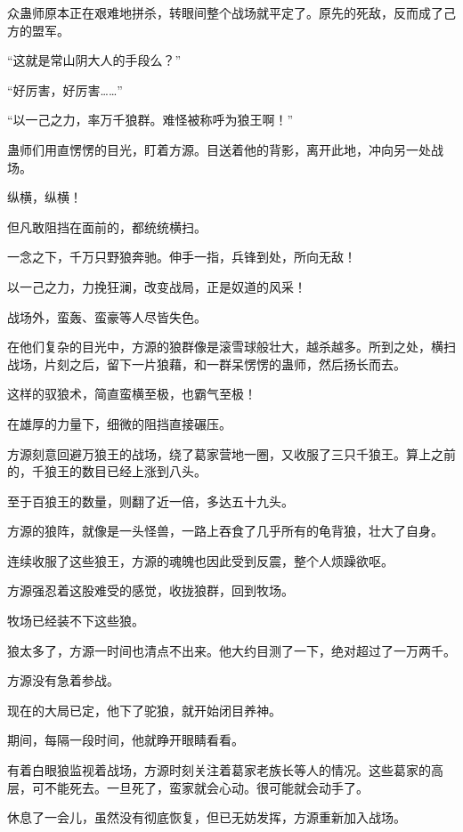 
\begin{this_body}

众蛊师原本正在艰难地拼杀，转眼间整个战场就平定了。原先的死敌，反而成了己方的盟军。

“这就是常山阴大人的手段么？”

“好厉害，好厉害……”

“以一己之力，率万千狼群。难怪被称呼为狼王啊！”

蛊师们用直愣愣的目光，盯着方源。目送着他的背影，离开此地，冲向另一处战场。

纵横，纵横！

但凡敢阻挡在面前的，都统统横扫。

一念之下，千万只野狼奔驰。伸手一指，兵锋到处，所向无敌！

以一己之力，力挽狂澜，改变战局，正是奴道的风采！

战场外，蛮轰、蛮豪等人尽皆失色。

在他们复杂的目光中，方源的狼群像是滚雪球般壮大，越杀越多。所到之处，横扫战场，片刻之后，留下一片狼藉，和一群呆愣愣的蛊师，然后扬长而去。

这样的驭狼术，简直蛮横至极，也霸气至极！

在雄厚的力量下，细微的阻挡直接碾压。

方源刻意回避万狼王的战场，绕了葛家营地一圈，又收服了三只千狼王。算上之前的，千狼王的数目已经上涨到八头。

至于百狼王的数量，则翻了近一倍，多达五十九头。

方源的狼阵，就像是一头怪兽，一路上吞食了几乎所有的龟背狼，壮大了自身。

连续收服了这些狼王，方源的魂魄也因此受到反震，整个人烦躁欲呕。

方源强忍着这股难受的感觉，收拢狼群，回到牧场。

牧场已经装不下这些狼。

狼太多了，方源一时间也清点不出来。他大约目测了一下，绝对超过了一万两千。

方源没有急着参战。

现在的大局已定，他下了驼狼，就开始闭目养神。

期间，每隔一段时间，他就睁开眼睛看看。

有着白眼狼监视着战场，方源时刻关注着葛家老族长等人的情况。这些葛家的高层，可不能死去。一旦死了，蛮家就会心动。很可能就会动手了。

休息了一会儿，虽然没有彻底恢复，但已无妨发挥，方源重新加入战场。


\end{this_body}
